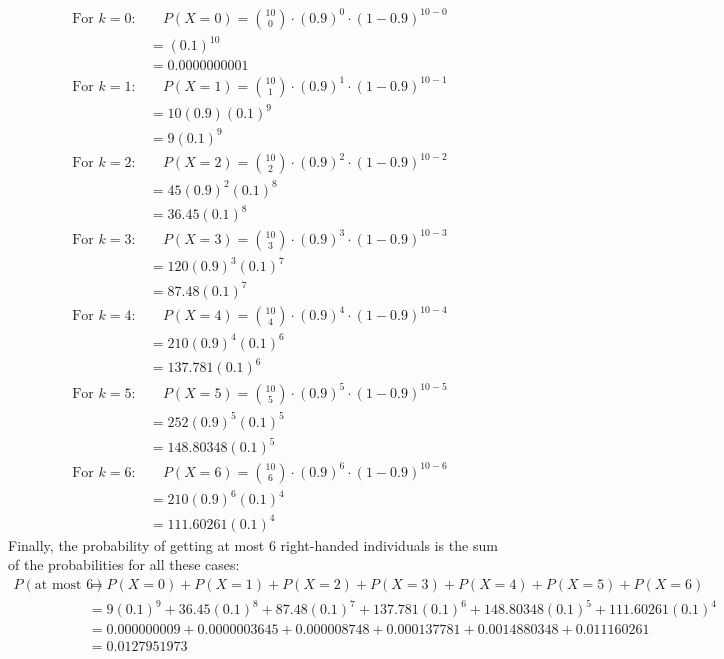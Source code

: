 \documentclass[journal,12pt,onecolumn]{IEEEtran}
\theoremstyle{remark}
\begin{document}
\begin{align}
\text{For } k = 0: & \quad P(X = 0)=\binom{10}{0} \cdot (0.9)^0 \cdot (1 - 0.9)^{10 - 0} \\
                                   &=(0.1)^{10} \\
                                   &=0.0000000001\\                             
\text{For } k = 1: & \quad P(X = 1)= \binom{10}{1} \cdot (0.9)^1 \cdot (1 - 0.9)^{10 - 1} \\
&=10(0.9)(0.1)^{9} \\
&=9(0.1)^{9}       \\                            
\text{For } k = 2: & \quad P(X = 2)= \binom{10}{2} \cdot (0.9)^2 \cdot (1 - 0.9)^{10 - 2} \\
&=45(0.9)^{2}(0.1)^{8}\\
&=36.45(0.1)^{8}\\
\text{For } k = 3: & \quad P(X = 3)= \binom{10}{3} \cdot (0.9)^3 \cdot (1 - 0.9)^{10 - 3} \\
&=120(0.9)^{3}(0.1)^{7}\\
&=87.48(0.1)^{7}\\
\text{For } k = 4: & \quad P(X = 4)= \binom{10}{4} \cdot (0.9)^4 \cdot (1 - 0.9)^{10 - 4} \\
&=210(0.9)^{4}(0.1)^{6}\\
&=137.781(0.1)^{6}\\
\text{For } k = 5: & \quad P(X = 5)= \binom{10}{5} \cdot (0.9)^5 \cdot (1 - 0.9)^{10 - 5} \\
&=252(0.9)^{5}(0.1)^{5}\\
&=148.80348(0.1)^{5}\\
\text{For } k = 6: & \quad P(X = 6)= \binom{10}{6} \cdot (0.9)^6 \cdot (1 - 0.9)^{10 - 6}\\
&=210(0.9)^{6}(0.1)^{4}\\
&=111.60261(0.1)^{4}
\end{align}
Finally, the probability of getting at most 6 right-handed individuals is the sum of the probabilities for all these cases:
\begin{align}
P(\text{at most 6}) &= P(X = 0) + P(X = 1) + P(X = 2) + P(X = 3) + P(X = 4) + P(X = 5) + P(X = 6)\\
&=9(0.1)^{9} +36.45(0.1)^{8}+87.48(0.1)^{7} + 137.781(0.1)^{6}+148.80348(0.1)^{5}+111.60261(0.1)^{4}\\
&=0.000000009 + 0.0000003645+0.000008748+0.000137781+0.0014880348+0.011160261 \\
&=0.0127951973
\end{align}
\end{document}
